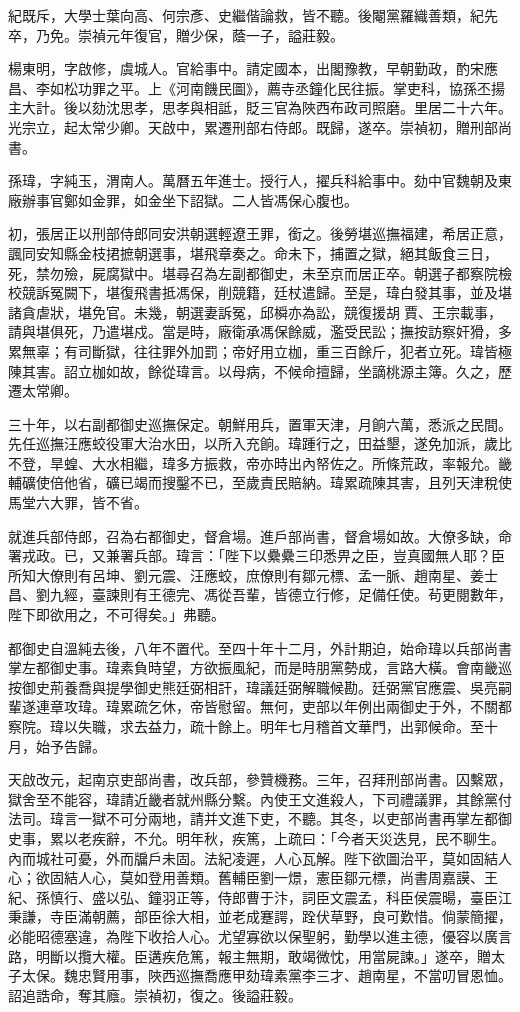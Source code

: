 \begin{pinyinscope}
紀既斥，大學士葉向高、何宗彥、史繼偕論救，皆不聽。後閹黨羅織善類，紀先卒，乃免。崇禎元年復官，贈少保，蔭一子，謚莊毅。

楊東明，字啟修，虞城人。官給事中。請定國本，出閣豫教，早朝勤政，酌宋應昌、李如松功罪之平。上《河南饑民圖》，薦寺丞鐘化民往振。掌吏科，協孫丕揚主大計。後以劾沈思孝，思孝與相詆，貶三官為陜西布政司照磨。里居二十六年。光宗立，起太常少卿。天啟中，累遷刑部右侍郎。既歸，遂卒。崇禎初，贈刑部尚書。

孫瑋，字純玉，渭南人。萬曆五年進士。授行人，擢兵科給事中。劾中官魏朝及東廠辦事官鄭如金罪，如金坐下詔獄。二人皆馮保心腹也。

初，張居正以刑部侍郎同安洪朝選輕遼王罪，銜之。後勞堪巡撫福建，希居正意，諷同安知縣金枝捃摭朝選事，堪飛章奏之。命未下，捕置之獄，絕其飯食三日，死，禁勿殮，屍腐獄中。堪尋召為左副都御史，未至京而居正卒。朝選子都察院檢校競訴冤闕下，堪復飛書抵馮保，削競籍，廷杖遣歸。至是，瑋白發其事，並及堪諸貪虐狀，堪免官。未幾，朝選妻訴冤，邱橓亦為訟，競復援胡賈、王宗載事，請與堪俱死，乃遣堪戍。當是時，廠衛承馮保餘威，濫受民訟；撫按訪察奸猾，多累無辜；有司斷獄，往往罪外加罰；帝好用立枷，重三百餘斤，犯者立死。瑋皆極陳其害。詔立枷如故，餘從瑋言。以母病，不候命擅歸，坐謫桃源主簿。久之，歷遷太常卿。

三十年，以右副都御史巡撫保定。朝鮮用兵，置軍天津，月餉六萬，悉派之民間。先任巡撫汪應蛟役軍大治水田，以所入充餉。瑋踵行之，田益墾，遂免加派，歲比不登，旱蝗、大水相繼，瑋多方振救，帝亦時出內帑佐之。所條荒政，率報允。畿輔礦使倍他省，礦已竭而搜鑿不已，至歲責民賠納。瑋累疏陳其害，且列天津稅使馬堂六大罪，皆不省。

就進兵部侍郎，召為右都御史，督倉場。進戶部尚書，督倉場如故。大僚多缺，命署戎政。已，又兼署兵部。瑋言：「陛下以纍纍三印悉畀之臣，豈真國無人耶？臣所知大僚則有呂坤、劉元震、汪應蛟，庶僚則有鄒元標、孟一脈、趙南星、姜士昌、劉九經，臺諫則有王德完、馮從吾輩，皆德立行修，足備任使。茍更閱數年，陛下即欲用之，不可得矣。」弗聽。

都御史自溫純去後，八年不置代。至四十年十二月，外計期迫，始命瑋以兵部尚書掌左都御史事。瑋素負時望，方欲振風紀，而是時朋黨勢成，言路大橫。會南畿巡按御史荊養喬與提學御史熊廷弼相訐，瑋議廷弼解職候勘。廷弼黨官應震、吳亮嗣輩遂連章攻瑋。瑋累疏乞休，帝皆慰留。無何，吏部以年例出兩御史于外，不關都察院。瑋以失職，求去益力，疏十餘上。明年七月稽首文華門，出郭候命。至十月，始予告歸。

天啟改元，起南京吏部尚書，改兵部，參贊機務。三年，召拜刑部尚書。囚繫眾，獄舍至不能容，瑋請近畿者就州縣分繫。內使王文進殺人，下司禮議罪，其餘黨付法司。瑋言一獄不可分兩地，請并文進下吏，不聽。其冬，以吏部尚書再掌左都御史事，累以老疾辭，不允。明年秋，疾篤，上疏曰：「今者天災迭見，民不聊生。內而城社可憂，外而牖戶未固。法紀凌遲，人心瓦解。陛下欲圖治平，莫如固結人心；欲固結人心，莫如登用善類。舊輔臣劉一燝，憲臣鄒元標，尚書周嘉謨、王紀、孫慎行、盛以弘、鐘羽正等，侍郎曹于汴，詞臣文震孟，科臣侯震暘，臺臣江秉謙，寺臣滿朝薦，部臣徐大相，並老成蹇諤，跧伏草野，良可歎惜。倘蒙簡擢，必能昭德塞違，為陛下收拾人心。尤望寡欲以保聖躬，勤學以進主德，優容以廣言路，明斷以攬大權。臣遘疾危篤，報主無期，敢竭微忱，用當屍諫。」遂卒，贈太子太保。魏忠賢用事，陜西巡撫喬應甲劾瑋素黨李三才、趙南星，不當叨冒恩恤。詔追誥命，奪其廕。崇禎初，復之。後謚莊毅。


\end{pinyinscope}
